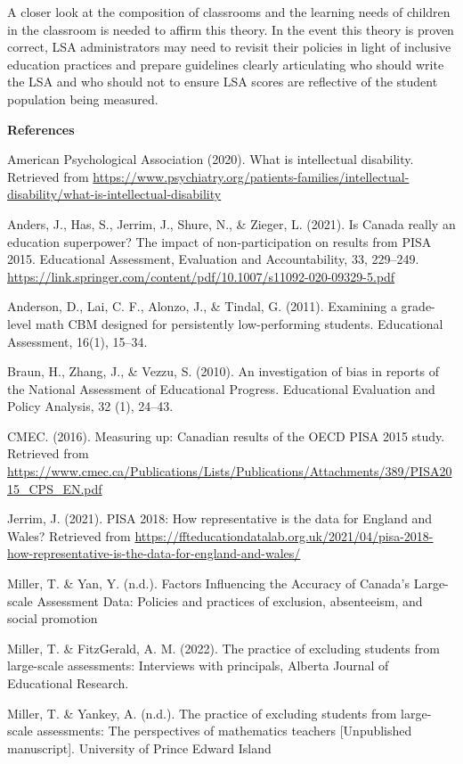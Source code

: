 \documentclass[
]{book}
\begin{document}
A closer look at the composition of classrooms and the learning needs of children in the classroom is needed to affirm this theory. In the event this theory is proven correct, LSA administrators may need to revisit their policies in light of inclusive education practices and prepare guidelines clearly articulating who should write the LSA and who should not to ensure LSA scores are reflective of the student population being measured.

\textbf{References}

American Psychological Association (2020). What is intellectual disability. Retrieved from \url{https://www.psychiatry.org/patients-families/intellectual-disability/what-is-intellectual-disability}

Anders, J., Has, S., Jerrim, J., Shure, N., \& Zieger, L. (2021). Is Canada really an education superpower? The impact of non-participation on results from PISA 2015. Educational Assessment, Evaluation and Accountability, 33, 229--249. \url{https://link.springer.com/content/pdf/10.1007/s11092-020-09329-5.pdf}

Anderson, D., Lai, C. F., Alonzo, J., \& Tindal, G. (2011). Examining a grade-level math CBM designed for persistently low-performing students. Educational Assessment, 16(1), 15--34.

Braun, H., Zhang, J., \& Vezzu, S. (2010). An investigation of bias in reports of the National Assessment of Educational Progress. Educational Evaluation and Policy Analysis, 32 (1), 24--43.

CMEC. (2016). Measuring up: Canadian results of the OECD PISA 2015 study. Retrieved from \url{https://www.cmec.ca/Publications/Lists/Publications/Attachments/389/PISA2015_CPS_EN.pdf}

Jerrim, J. (2021). PISA 2018: How representative is the data for England and Wales? Retrieved from \url{https://ffteducationdatalab.org.uk/2021/04/pisa-2018-how-representative-is-the-data-for-england-and-wales/}

Miller, T. \& Yan, Y. (n.d.). Factors Influencing the Accuracy of Canada's Large-scale Assessment Data: Policies and practices of exclusion, absenteeism, and social promotion

Miller, T. \& FitzGerald, A. M. (2022). The practice of excluding students from large-scale assessments: Interviews with principals, Alberta Journal of Educational Research.

Miller, T. \& Yankey, A. (n.d.). The practice of excluding students from large-scale assessments: The perspectives of mathematics teachers {[}Unpublished manuscript{]}. University of Prince Edward Island
\end{document}

